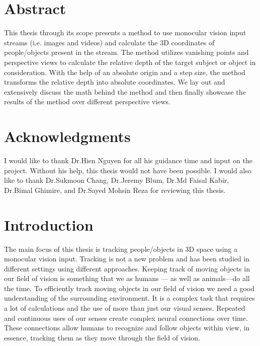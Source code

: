 \documentclass[12pt]{report}
\begin{document}
\chapter*{Abstract}
This thesis through its scope presents a method to use monocular vision input streams (i.e. images and videos) and calculate the 3D coordinates of people/objects present in the stream. The method utilizes vanishing points and perspective views to calculate the relative depth of the target subject or object in consideration. With the help of an absolute origin and a step size, the method transforms the relative depth into absolute coordinates. We lay out and extensively discuss the math behind the method and then finally showcase the results of the method over different perspective views.


\tableofcontents


\listoffigures


\listofalgorithms


\chapter*{Acknowledgments}
I would like to thank Dr.Hien Nguyen for all his guidance time and input on the project. Without his help, this thesis would not have been possible. I would also like to thank Dr.Sukmoon Chang, Dr.Jeremy Blum, Dr.Md Faisal Kabir, Dr.Bimal Ghimire, and Dr.Sayed Mohsin Reza for reviewing this thesis.

\clearpage
{}

\chapter{Introduction}


The main focus of this thesis is tracking people/objects in 3D space using a monocular vision input. Tracking is not a new problem and has been studied in different settings using different approaches. Keeping track of moving objects in our field of vision is something that we as humans — as well as animals—do all the time. To efficiently track moving objects in our field of vision we need a good understanding of the surrounding environment. It is a complex task that requires a lot of calculations and the use of more than just our visual senses. Repeated and continuous uses of our senses create complex neural connections over time. These connections allow humans to recognize and follow objects within view, in essence, tracking them as they move through the field of vision.\newline
\end{document}
